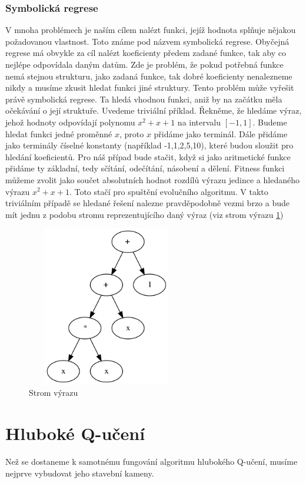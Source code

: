 \subsubsection{Symbolická regrese}
V mnoha problémech je naším cílem nalézt funkci, jejíž hodnota splňuje nějakou požadovanou vlastnost. Toto známe pod názvem symbolická regrese.
Obyčejná regrese má obvykle za cíl nalézt koeficienty předem zadané funkce, tak aby co nejlépe odpovídala daným datům.
Zde je problém, že pokud potřebná funkce nemá stejnou strukturu, jako zadaná funkce, tak dobré koeficienty nenalezneme nikdy a musíme zkusit hledat funkci jiné struktury.
Tento problém může vyřešit právě symbolická regrese. Ta hledá vhodnou funkci, aniž by na začátku měla očekávání o její struktuře.
Uvedeme triviální příklad. Řekněme, že hledáme výraz, jehož hodnoty odpovídají polynomu $x^2+x+1$ na intervalu $[-1,1]$.
Budeme hledat funkci jedné proměnné $x$, proto $x$ přidáme jako terminál. Dále přidáme jako terminály číselné konstanty (například -1,1,2,5,10), které budou sloužit pro hledání koeficientů.
Pro náš případ bude stačit, když si jako aritmetické funkce přidáme ty základní, tedy sčítání, odečítání, násobení a dělení.
Fitness funkci můžeme zvolit jako součet absolutních hodnot rozdílů výrazu jedince a hledaného výrazu $x^2+x+1$.
Toto stačí pro spuštění evolučního algoritmu. 
V takto triviálním případě se hledané řešení nalezne pravděpodobně vezmi brzo a bude mít jednu z podobu stromu reprezentujícího daný výraz (viz strom výrazu \ref{obr04:GrafFormule})


\begin{figure}[p]\centering
\includegraphics[width=70mm, height=70mm]{./Obrazky/formule_graph_2.png}
\caption{Strom výrazu}
\label{obr04:GrafFormule}
\end{figure}



\newpage
\section{Hluboké Q-učení}
Než se dostaneme k samotnému fungování algoritmu hlubokého Q-učení, musíme nejprve vybudovat jeho stavební kameny.

